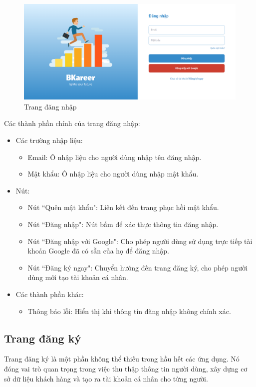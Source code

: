 \begin{figure}[H]
    \centering
    \includegraphics[width=0.8\linewidth]{images/chap5/login.png}
    \vspace{0.5cm}
    \caption{Trang đăng nhập}
\end{figure}

Các thành phần chính của trang đăng nhập:
\begin{itemize}
    \item Các trường nhập liệu:
        \begin{itemize}
            \item Email: Ô nhập liệu cho người dùng nhập tên đăng nhập.
            \item Mật khẩu: Ô nhập liệu cho người dùng nhập mật khẩu.
        \end{itemize}
    \item Nút:
        \begin{itemize}
            \item Nút ``Quên mật khẩu": Liên kết đến trang phục hồi mật khẩu.
            \item Nút ``Đăng nhập": Nút bấm để xác thực thông tin đăng nhập.
            \item Nút ``Đăng nhập với Google": Cho phép người dùng sử dụng trực tiếp tài khoản Google đã có sẵn của họ để đăng nhập.
            \item Nút ``Đăng ký ngay": Chuyển hướng đến trang đăng ký, cho phép người dùng mới tạo tài khoản cá nhân.
        \end{itemize}
    \item Các thành phần khác:
        \begin{itemize}
            \item Thông báo lỗi: Hiển thị khi thông tin đăng nhập không chính xác.
        \end{itemize}
\end{itemize}


\subsection{Trang đăng ký}
Trang đăng ký là một phần không thể thiếu trong hầu hết các ứng dụng. Nó đóng vai trò quan trọng trong việc thu thập thông tin người dùng, xây dựng cơ sở dữ liệu khách hàng và tạo ra tài khoản cá nhân cho từng người.

